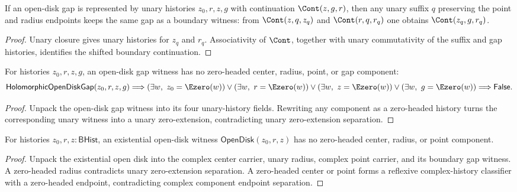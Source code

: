 \begin{lemma}
\label{lem:open-disk-unary-suffix-transport}
If an open-disk gap is represented by unary histories \(z_0,r,z,g\) with continuation
\(\Cont(z,g,r)\), then any unary suffix \(q\) preserving the point and radius endpoints
keeps the same gap as a boundary witness: from \(\Cont(z,q,z_q)\) and \(\Cont(r,q,r_q)\)
one obtains \(\Cont(z_q,g,r_q)\).
\end{lemma}
\begin{proof}
Unary closure gives unary histories for \(z_q\) and \(r_q\). Associativity of
\(\Cont\), together with unary commutativity of the suffix and gap histories, identifies
the shifted boundary continuation.
\end{proof}

\begin{theorem}
\label{thm:holomorphic-open-disk-gap-zero-headed-component-absurd}
For histories \(z_0,r,z,g\), an open-disk gap witness has no zero-headed
center, radius, point, or gap component:
$$
\mathsf{HolomorphicOpenDiskGap}(z_0,r,z,g)
\Longrightarrow
\left(\exists w,\ z_0=\Ezero(w)\right)\lor
\left(\exists w,\ r=\Ezero(w)\right)\lor
\left(\exists w,\ z=\Ezero(w)\right)\lor
\left(\exists w,\ g=\Ezero(w)\right)
\Longrightarrow
\mathsf{False}.
$$
\end{theorem}
\begin{proof}
Unpack the open-disk gap witness into its four unary-history fields. Rewriting
any component as a zero-headed history turns the corresponding unary witness
into a unary zero-extension, contradicting unary zero-extension separation.
\end{proof}

\begin{theorem}
\label{thm:open-disk-zero-headed-component-absurd}
For histories \(z_0,r,z:\mathsf{BHist}\), an existential open-disk witness
\(\mathsf{OpenDisk}(z_0,r,z)\) has no zero-headed center, radius, or point
component.
\end{theorem}
\begin{proof}
Unpack the existential open disk into the complex center carrier, unary radius,
complex point carrier, and its boundary gap witness. A zero-headed radius
contradicts unary zero-extension separation. A zero-headed center or point
forms a reflexive complex-history classifier with a zero-headed endpoint,
contradicting complex component endpoint separation.
\end{proof}

